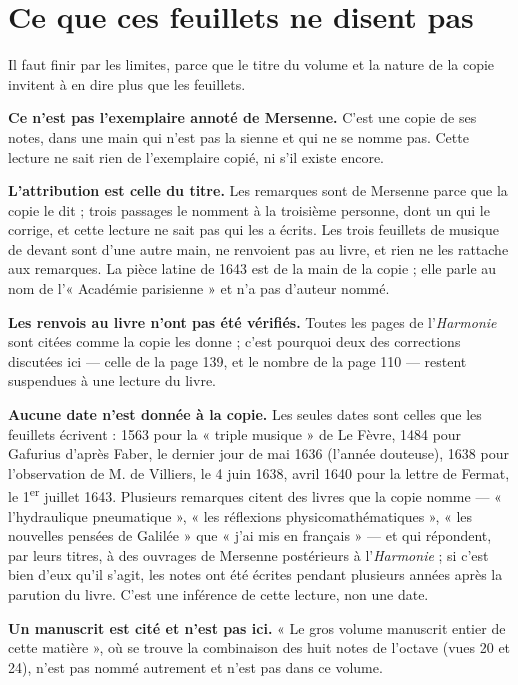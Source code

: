 \documentclass[11pt,a4paper]{article}
\begin{document}
\section*{Ce que ces feuillets ne disent pas}

Il faut finir par les limites, parce que le titre du volume et la nature de
la copie invitent à en dire plus que les feuillets.

\textbf{Ce n'est pas l'exemplaire annoté de Mersenne.} C'est une copie de ses
notes, dans une main qui n'est pas la sienne et qui ne se nomme pas. Cette
lecture ne sait rien de l'exemplaire copié, ni s'il existe encore.

\textbf{L'attribution est celle du titre.} Les remarques sont de Mersenne parce
que la copie le dit ; trois passages le nomment à la troisième personne, dont un
qui le corrige, et cette lecture ne sait pas qui les a écrits. Les trois
feuillets de musique de devant sont d'une autre main, ne renvoient pas au
livre, et rien ne les rattache aux remarques. La pièce latine de 1643 est de la
main de la copie ; elle parle au nom de l'« Académie parisienne » et n'a pas
d'auteur nommé.

\textbf{Les renvois au livre n'ont pas été vérifiés.} Toutes les pages de
l'\emph{Harmonie} sont citées comme la copie les donne ; c'est pourquoi deux des
corrections discutées ici — celle de la page 139, et le nombre de la page 110 —
restent suspendues à une lecture du livre.

\textbf{Aucune date n'est donnée à la copie.} Les seules dates sont celles que les
feuillets écrivent : 1563 pour la « triple musique » de Le Fèvre, 1484 pour
Gafurius d'après Faber, le dernier jour de mai 1636 (l'année douteuse), 1638
pour l'observation de M. de Villiers, le 4 juin 1638, avril 1640 pour la lettre
de Fermat, le 1\textsuperscript{er} juillet 1643. Plusieurs remarques citent des
livres que la copie nomme — « l'hydraulique pneumatique », « les réflexions
physicomathématiques », « les nouvelles pensées de Galilée » que « j'ai mis en
français » — et qui répondent, par leurs titres, à des ouvrages de Mersenne
postérieurs à l'\emph{Harmonie} ; si c'est bien d'eux qu'il s'agit, les notes ont
été écrites pendant plusieurs années après la parution du livre. C'est une
inférence de cette lecture, non une date.

\textbf{Un manuscrit est cité et n'est pas ici.} « Le gros volume manuscrit
entier de cette matière », où se trouve la combinaison des huit notes de
l'octave (vues 20 et 24), n'est pas nommé autrement et n'est pas dans ce
volume.
\end{document}
